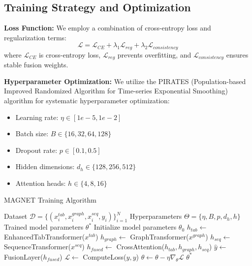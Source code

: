 \documentclass[a4paper,11pt]{article}
\begin{document}
\subsection{Training Strategy and Optimization}

\textbf{Loss Function:}
We employ a combination of cross-entropy loss and regularization terms:
\begin{equation}
\mathcal{L} = \mathcal{L}_{CE} + \lambda_1 \mathcal{L}_{reg} + \lambda_2 \mathcal{L}_{consistency}
\end{equation}
where $\mathcal{L}_{CE}$ is cross-entropy loss, $\mathcal{L}_{reg}$ prevents overfitting, and $\mathcal{L}_{consistency}$ ensures stable fusion weights.

\textbf{Hyperparameter Optimization:}
We utilize the PIRATES (Population-based Improved Randomized Algorithm for Time-series Exponential Smoothing) algorithm for systematic hyperparameter optimization:
\begin{itemize}
    \item Learning rate: $\eta \in [1e-5, 1e-2]$
    \item Batch size: $B \in \{16, 32, 64, 128\}$
    \item Dropout rate: $p \in [0.1, 0.5]$
    \item Hidden dimensions: $d_h \in \{128, 256, 512\}$
    \item Attention heads: $h \in \{4, 8, 16\}$
\end{itemize}

\begin{algorithm}
\caption{MAGNET Training Algorithm}
\begin{algorithmic}[1]
\REQUIRE Dataset $\mathcal{D} = \{(x_i^{tab}, x_i^{graph}, x_i^{seq}, y_i)\}_{i=1}^N$
\REQUIRE Hyperparameters $\Theta = \{\eta, B, p, d_h, h\}$
\ENSURE Trained model parameters $\theta^*$
\STATE Initialize model parameters $\theta_0$
        \STATE $h_{tab} \leftarrow$ EnhancedTabTransformer($x^{tab}$)
        \STATE $h_{graph} \leftarrow$ GraphTransformer($x^{graph}$)
        \STATE $h_{seq} \leftarrow$ SequenceTransformer($x^{seq}$)
        \STATE $h_{fused} \leftarrow$ CrossAttention($h_{tab}, h_{graph}, h_{seq}$)
        \STATE $\hat{y} \leftarrow$ FusionLayer($h_{fused}$)
        \STATE $\mathcal{L} \leftarrow$ ComputeLoss($\hat{y}, y$)
        \STATE $\theta \leftarrow \theta - \eta \nabla_\theta \mathcal{L}$
    \ENDFOR
\ENDFOR
\RETURN $\theta^*$
\end{algorithmic}
\end{algorithm}
\end{document}
